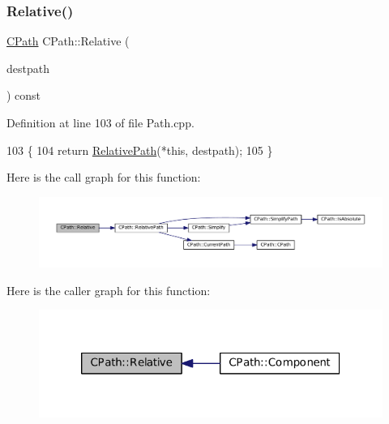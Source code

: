 \subsubsection{\texorpdfstring{Relative()}{Relative()}}
{\footnotesize\ttfamily \hyperlink{classCPath}{C\+Path} C\+Path\+::\+Relative (\begin{DoxyParamCaption}\item[{const \hyperlink{classCPath}{C\+Path} \&}]{destpath }\end{DoxyParamCaption}) const}



Definition at line 103 of file Path.\+cpp.


\begin{DoxyCode}
103                                                 \{
104     \textcolor{keywordflow}{return} \hyperlink{classCPath_a76f73670ecc0a434c2f8a1ea0f1a040e}{RelativePath}(*\textcolor{keyword}{this}, destpath);
105 \}
\end{DoxyCode}
Here is the call graph for this function\+:
\nopagebreak
\begin{figure}[H]
\begin{center}
\leavevmode
\includegraphics[width=350pt]{classCPath_aaf49ee9d0f8ed1ffa6bb5e18aba86b4f_cgraph}
\end{center}
\end{figure}
Here is the caller graph for this function\+:
\nopagebreak
\begin{figure}[H]
\begin{center}
\leavevmode
\includegraphics[width=320pt]{classCPath_aaf49ee9d0f8ed1ffa6bb5e18aba86b4f_icgraph}
\end{center}
\end{figure}
\hypertarget{classCPath_a76f73670ecc0a434c2f8a1ea0f1a040e}{}\label{classCPath_a76f73670ecc0a434c2f8a1ea0f1a040e} 
